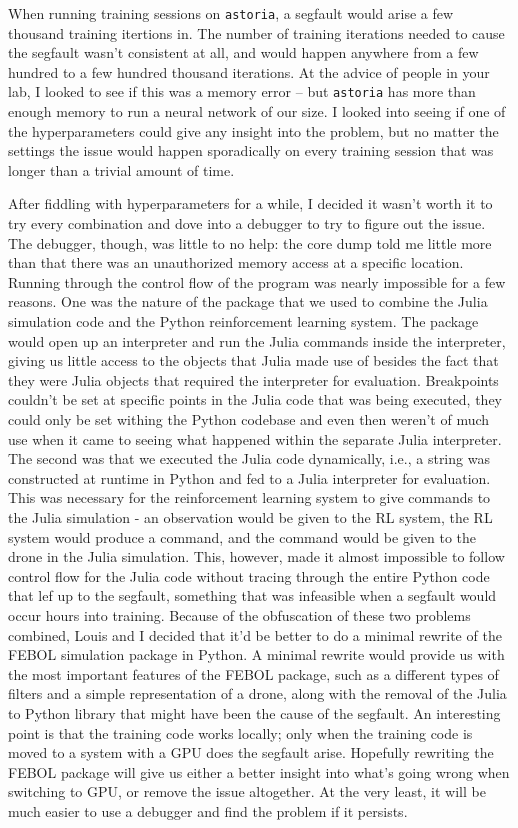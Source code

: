 \documentclass{article}
\begin{document}
When running training sessions on \texttt{astoria}, a segfault would arise a few thousand training itertions in. 
The number of training iterations needed to cause the segfault wasn't consistent at all, and would happen anywhere from a few hundred to a few hundred thousand iterations.
At the advice of people in your lab, I looked to see if this was a memory error -- but \texttt{astoria} has more than enough memory to run a neural network of our size. 
I looked into seeing if one of the hyperparameters could give any insight into the problem, but no matter the settings the issue would happen sporadically on every training session that was longer than a trivial amount of time.


After fiddling with hyperparameters for a while, I decided it wasn't worth it to try every combination and dove into a debugger to try to figure out the issue. 
The debugger, though, was little to no help: the core dump told me little more than that there was an unauthorized memory access at a specific location.
Running through the control flow of the program was nearly impossible for a few reasons.
One was the nature of the package that we used to combine the Julia simulation code and the Python reinforcement learning system.
The package would open up an interpreter and run the Julia commands inside the interpreter, giving us little access to the objects that Julia made use of besides the fact that they were Julia objects that required the interpreter for evaluation.
Breakpoints couldn't be set at specific points in the Julia code that was being executed, they could only be set withing the Python codebase and even then weren't of much use when it came to seeing what happened within the separate Julia interpreter.
The second was that we executed the Julia code dynamically, i.e., a string was constructed at runtime in Python and fed to a Julia interpreter for evaluation.
This was necessary for the reinforcement learning system to give commands to the Julia simulation - an observation would be given to the RL system, the RL system would produce a command, and the command would be given to the drone in the Julia simulation. 
This, however, made it almost impossible to follow control flow for the Julia code without tracing through the entire Python code that lef up to the segfault, something that was infeasible when a segfault would occur hours into training.
Because of the obfuscation of these two problems combined, Louis and I decided that it'd be better to do a minimal rewrite of the FEBOL simulation package in Python.
A minimal rewrite would provide us with the most important features of the FEBOL package, such as a different types of filters and a simple representation of a drone, along with the removal of the Julia to Python library that might have been the cause of the segfault.
An interesting point is that the training code works locally; only when the training code is moved to a system with a GPU does the segfault arise.
Hopefully rewriting the FEBOL package will give us either a better insight into what's going wrong when switching to GPU, or remove the issue altogether.
At the very least, it will be much easier to use a debugger and find the problem if it persists.




\end{document}
